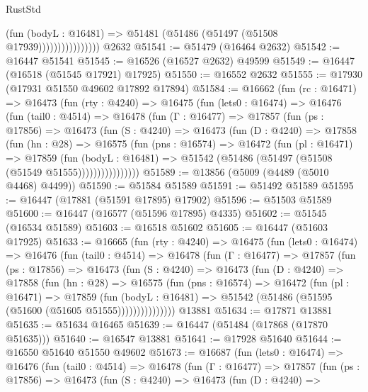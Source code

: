 \begin{lexlean}{RustStd}
\begin{coremodule}
                            (fun (bodyL : @16481) =>
                            @51481 (@51486 (@51497 (@51508 @17939))))))))))))))))
    @2632
@51541 := @51479 (@16464 @2632)
@51542 := @16447 @51541
@51545 := @16526 (@16527 @2632) @49599
@51549 := @16447 (@16518 (@51545 @17921) @17925)
@51550 := @16552 @2632
@51555 := @17930 (@17931 @51550 @49602 @17892 @17894)
@51584 := @16662
    (fun (rc : @16471) =>
    @16473
      (fun (rty : @4240) =>
      @16475
        (fun (lets0 : @16474) =>
        @16476
          (fun (tail0 : @4514) =>
          @16478
            (fun (Γ : @16477) =>
            @17857
              (fun (ps : @17856) =>
              @16473
                (fun (S : @4240) =>
                @16473
                  (fun (D : @4240) =>
                  @17858
                    (fun (hn : @28) =>
                    @16575
                      (fun (pns : @16574) =>
                      @16472
                        (fun (pl : @16471) =>
                        @17859
                          (fun (bodyL : @16481) =>
                          @51542 (@51486 (@51497 (@51508 (@51549 @51555))))))))))))))))
@51589 := @13856 (@5009 (@4489 (@5010 @4468) @4499))
@51590 := @51584 @51589
@51591 := @51492 @51589
@51595 := @16447 (@17881 (@51591 @17895) @17902)
@51596 := @51503 @51589
@51600 := @16447 (@16577 (@51596 @17895) @4335)
@51602 := @51545 (@16534 @51589)
@51603 := @16518 @51602
@51605 := @16447 (@51603 @17925)
@51633 := @16665
    (fun (rty : @4240) =>
    @16475
      (fun (lets0 : @16474) =>
      @16476
        (fun (tail0 : @4514) =>
        @16478
          (fun (Γ : @16477) =>
          @17857
            (fun (ps : @17856) =>
            @16473
              (fun (S : @4240) =>
              @16473
                (fun (D : @4240) =>
                @17858
                  (fun (hn : @28) =>
                  @16575
                    (fun (pns : @16574) =>
                    @16472
                      (fun (pl : @16471) =>
                      @17859
                        (fun (bodyL : @16481) =>
                        @51542 (@51486 (@51595 (@51600 (@51605 @51555)))))))))))))))
    @13881
@51634 := @17871 @13881
@51635 := @51634 @16465
@51639 := @16447 (@51484 (@17868 (@17870 @51635)))
@51640 := @16547 @13881
@51641 := @17928 @51640
@51644 := @16550 @51640 @51550 @49602
@51673 := @16687
    (fun (lets0 : @16474) =>
    @16476
      (fun (tail0 : @4514) =>
      @16478
        (fun (Γ : @16477) =>
        @17857
          (fun (ps : @17856) =>
          @16473
            (fun (S : @4240) =>
            @16473
              (fun (D : @4240) =>

\end{coremodule}
\end{lexlean}
